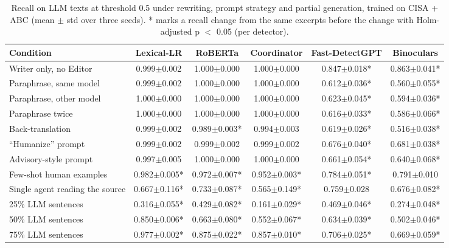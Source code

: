 \begin{table}[t]
\centering
\footnotesize
\caption{Recall on LLM texts at threshold 0.5 under rewriting, prompt strategy and partial generation, trained on CISA + ABC (mean $\pm$ std over three seeds). * marks a recall change from the same excerpts before the change with Holm-adjusted p $<$ 0.05 (per detector).}
\label{tab:robustness}
\begin{tabular}{lccccc}
\toprule
Condition & Lexical-LR & RoBERTa & Coordinator & Fast-DetectGPT & Binoculars \\
\midrule
Writer only, no Editor & 0.999$\pm$0.002 & 1.000$\pm$0.000 & 1.000$\pm$0.000 & 0.847$\pm$0.018* & 0.863$\pm$0.041* \\
Paraphrase, same model & 0.999$\pm$0.002 & 1.000$\pm$0.000 & 1.000$\pm$0.000 & 0.612$\pm$0.036* & 0.560$\pm$0.055* \\
Paraphrase, other model & 1.000$\pm$0.000 & 1.000$\pm$0.000 & 1.000$\pm$0.000 & 0.623$\pm$0.045* & 0.594$\pm$0.036* \\
Paraphrase twice & 1.000$\pm$0.000 & 1.000$\pm$0.000 & 1.000$\pm$0.000 & 0.616$\pm$0.033* & 0.586$\pm$0.066* \\
Back-translation & 0.999$\pm$0.002 & 0.989$\pm$0.003* & 0.994$\pm$0.003 & 0.619$\pm$0.026* & 0.516$\pm$0.038* \\
``Humanize'' prompt & 0.999$\pm$0.002 & 0.999$\pm$0.002 & 0.999$\pm$0.002 & 0.676$\pm$0.040* & 0.681$\pm$0.038* \\
Advisory-style prompt & 0.997$\pm$0.005 & 1.000$\pm$0.000 & 1.000$\pm$0.000 & 0.661$\pm$0.054* & 0.640$\pm$0.068* \\
Few-shot human examples & 0.982$\pm$0.005* & 0.972$\pm$0.007* & 0.952$\pm$0.003* & 0.784$\pm$0.051* & 0.791$\pm$0.010 \\
Single agent reading the source & 0.667$\pm$0.116* & 0.733$\pm$0.087* & 0.565$\pm$0.149* & 0.759$\pm$0.028 & 0.676$\pm$0.082* \\
25\% LLM sentences & 0.316$\pm$0.055* & 0.429$\pm$0.082* & 0.161$\pm$0.029* & 0.469$\pm$0.046* & 0.274$\pm$0.048* \\
50\% LLM sentences & 0.850$\pm$0.006* & 0.663$\pm$0.080* & 0.552$\pm$0.067* & 0.634$\pm$0.039* & 0.502$\pm$0.046* \\
75\% LLM sentences & 0.977$\pm$0.002* & 0.875$\pm$0.022* & 0.857$\pm$0.010* & 0.706$\pm$0.025* & 0.669$\pm$0.059* \\
\bottomrule
\end{tabular}
\end{table}
